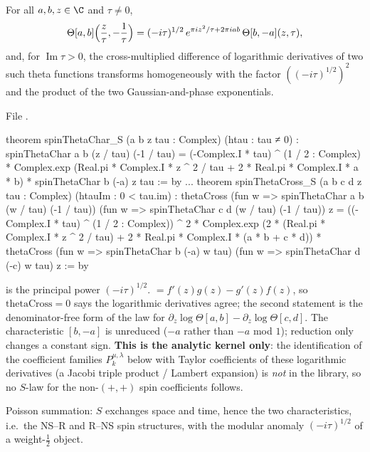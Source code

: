 \begin{theorem}\label{l17:thm:thetaS}
For all $a,b,z\in\C$ and $\tau\neq0$,
\begin{equation*}
\Theta[a,b]\Bigl(\frac z\tau,-\frac1\tau\Bigr)=(-i\tau)^{1/2}\,e^{\pi iz^2/\tau+2\pi iab}\,\Theta[b,-a](z,\tau),
\end{equation*}
and, for $\operatorname{Im}\tau>0$, the cross-multiplied difference of logarithmic derivatives of two
such theta functions transforms homogeneously with the factor $((-i\tau)^{1/2})^2$ and the product of
the two Gaussian-and-phase exponentials.
\end{theorem}
\noindent File .
\begin{leancode}
theorem spinThetaChar_S (a b z tau : Complex) (htau : tau ≠ 0) :
    spinThetaChar a b (z / tau) (-1 / tau) =
      (-Complex.I * tau) ^ (1 / 2 : Complex) *
        Complex.exp (Real.pi * Complex.I * z ^ 2 / tau +
          2 * Real.pi * Complex.I * a * b) * spinThetaChar b (-a) z tau := by
...
theorem spinThetaCross_S
    (a b c d z tau : Complex) (htauIm : 0 < tau.im) :
    thetaCross
        (fun w => spinThetaChar a b (w / tau) (-1 / tau))
        (fun w => spinThetaChar c d (w / tau) (-1 / tau)) z =
      ((-Complex.I * tau) ^ (1 / 2 : Complex)) ^ 2 *
        Complex.exp (2 * (Real.pi * Complex.I * z ^ 2 / tau) +
          2 * Real.pi * Complex.I * (a * b + c * d)) *
        thetaCross (fun w => spinThetaChar b (-a) w tau)
          (fun w => spinThetaChar d (-c) w tau) z := by
\end{leancode}
\begin{dictionary}
 is the principal power $(-i\tau)^{1/2}$.
 $=f'(z)g(z)-g'(z)f(z)$, so $\mathrm{thetaCross}=0$ says the logarithmic
derivatives agree; the second statement is the denominator-free form of the law for
$\partial_z\log\Theta[a,b]-\partial_z\log\Theta[c,d]$. The characteristic $[b,-a]$ is unreduced
($-a$ rather than $-a$ mod $1$); reduction only changes a constant sign. \textbf{This is the analytic
kernel only}: the identification of the coefficient families $P^{\mu,\lambda}_k$ below with Taylor
coefficients of these logarithmic derivatives (a Jacobi triple product / Lambert expansion) is
\emph{not} in the library, so no $S$-law for the non-$(+,+)$ spin coefficients follows.
\end{dictionary}
\begin{physics}
Poisson summation: $S$ exchanges space and time, hence the two characteristics, i.e.\ the NS--R and
R--NS spin structures, with the modular anomaly $(-i\tau)^{1/2}$ of a weight-$\frac12$ object.
\end{physics}
